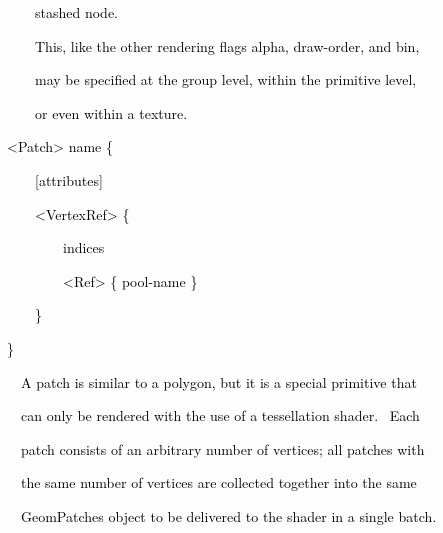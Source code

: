 \documentclass[a4paper]{article}
\newcommand\textstyleOOoComputerKeyWord[1]{\textrm{\textcolor[rgb]{0.0,0.0,0.5019608}{#1}}}
\begin{document}
{\color{black}
\textstyleOOoComputerKeyWord{\textcolor{black}{\ \ \ \ {\textquotedbl}stashed{\textquotedbl} node.}}}


\bigskip

{\color{black}
\textstyleOOoComputerKeyWord{\textcolor{black}{\ \ \ \ This, like the other rendering flags alpha, draw-order, and
bin,}}}

{\color{black}
\textstyleOOoComputerKeyWord{\textcolor{black}{\ \ \ \ may be specified at the group level, within the primitive
level,}}}

{\color{black}
\textstyleOOoComputerKeyWord{\textcolor{black}{\ \ \ \ or even within a texture.}}}


\bigskip


\bigskip

{\color{black}
\textstyleOOoComputerKeyWord{\textcolor{black}{{\textless}Patch{\textgreater} name \{ }}}

{\color{black}
\textstyleOOoComputerKeyWord{\textcolor{black}{\ \ \ \ [attributes] }}}

{\color{black}
\textstyleOOoComputerKeyWord{\textcolor{black}{\ \ \ \ {\textless}VertexRef{\textgreater} \{ }}}

{\color{black}
\textstyleOOoComputerKeyWord{\textcolor{black}{\ \ \ \ \ \ \ \ indices }}}

{\color{black}
\textstyleOOoComputerKeyWord{\textcolor{black}{\ \ \ \ \ \ \ \ {\textless}Ref{\textgreater} \{ pool-name \} }}}

{\color{black}
\textstyleOOoComputerKeyWord{\textcolor{black}{\ \ \ \ \} }}}

{\color{black}
\textstyleOOoComputerKeyWord{\textcolor{black}{\}}}}


\bigskip

{\color{black}
\textstyleOOoComputerKeyWord{\textcolor{black}{\ \ A patch is similar to a polygon, but it is a special primitive
that}}}

{\color{black}
\textstyleOOoComputerKeyWord{\textcolor{black}{\ \ can only be rendered with the use of a tessellation shader. \ Each}}}

{\color{black}
\textstyleOOoComputerKeyWord{\textcolor{black}{\ \ patch consists of an arbitrary number of vertices; all patches
with}}}

{\color{black}
\textstyleOOoComputerKeyWord{\textcolor{black}{\ \ the same number of vertices are collected together into the same}}}

{\color{black}
\textstyleOOoComputerKeyWord{\textcolor{black}{\ \ GeomPatches object to be delivered to the shader in a single
batch.}}}
\end{document}
